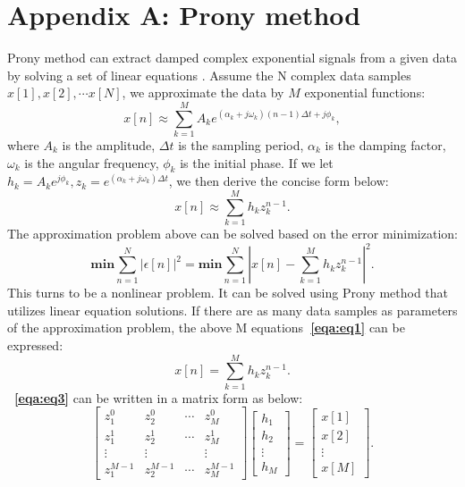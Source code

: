 \section{Appendix A: Prony method}
Prony method can extract damped complex exponential signals 
from a given data by solving a set of linear equations 
\cite[]{prony,prony2003,ThomasPeter2013,Mitrofanov2015}. 
Assume the N complex data samples $x[1],x[2],\cdots x[N]$,
 we approximate the data by $M$ exponential functions:
\begin{equation}
    \label{eqa:eq0}
     x[n] \approx \sum_{k=1}^{M}A_k e^{(\alpha_k + j\omega_k)(n-1)\Delta t + j\phi_k},
\end{equation}
where $A_k$ is the amplitude, $\Delta t$ is the sampling period, 
$\alpha_k$ is the damping factor, $\omega_k$ is the angular frequency, $\phi_k$ is 
the initial phase.
If we let $h_k = A_k e^{j\phi_k}, z_k = e^{(\alpha_k + j\omega_k)\Delta t}$, 
we then derive the concise form below:
\begin{equation}
    \label{eqa:eq1}
     x[n] \approx \sum_{k=1}^{M}h_k z_k^{n-1}.
\end{equation}
The approximation problem above can be solved based on the error minimization:
\begin{equation}
    \label{eqa:eq2}
    \mathbf{min} \sum_{n=1}^{N} \left|\epsilon[n]\right|^2 = 
    \mathbf{min}\sum_{n=1}^{N}\left | x[n] - \sum_{k=1}^{M}h_k z_k^{n-1}\right|^2.
\end{equation}
This turns to be a nonlinear problem. It can be solved using 
Prony method that utilizes linear equation solutions.
If there are as many data samples as parameters of the approximation problem,
the above M equations\textbf{~\ref{eqa:eq1}} can be expressed:
\begin{equation}
    \label{eqa:eq3}
     x[n] = \sum_{k=1}^{M}h_k z_k^{n-1}.
\end{equation}
\textbf{~\ref{eqa:eq3}} can be written in a matrix form as below:
\begin{equation}
    \label{eqa:eq4}
    \left[ \begin{array}{cccc}
        z_1^0 & z_2^0 & \cdots & z_M^0\\
        z_1^1 & z_2^1 & \cdots & z_M^1\\
        \vdots & \vdots & & \vdots\\
        z_1^{M-1} & z_2^{M-1} & \cdots & z_M^{M-1}
    \end{array} \right]
    \left[ \begin{array}{c} h_1\\ h_2\\ \vdots \\ h_M
    \end{array} \right] =
    \left[ \begin{array}{c} x[1]\\ x[2]\\ \vdots \\ x[M]
    \end{array} \right].
\end{equation}
